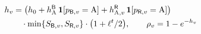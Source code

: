 
\color{ink}$\displaystyle
\begin{aligned}h_v&=\big(h_0+h^{\mathsf{B}}_{\mathrm{A}}\,\mathbf{1}[p_{\mathsf{B},v}=\mathrm{A}]+h^{\mathsf{R}}_{\mathrm{A},v}\,\mathbf{1}[p_{\mathsf{R},v}=\mathrm{A}]\big)\\&\quad\cdot\min\{S_{\mathsf{B},v},S_{\mathsf{R},v}\}\cdot\big(1+\ell^t/2\big),\qquad \rho_v=1-e^{-h_v}\end{aligned}
$
